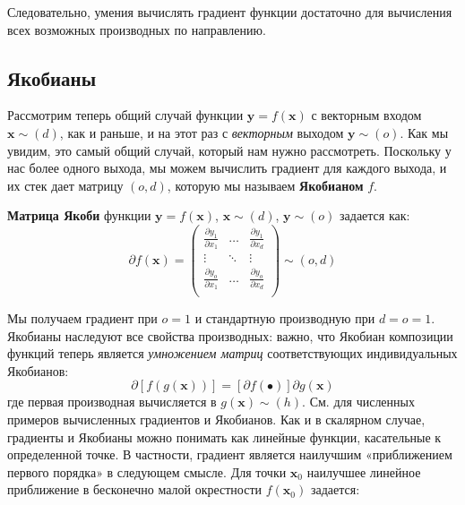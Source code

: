 Следовательно, умения вычислять градиент функции достаточно для вычисления всех возможных производных по направлению.

\subsection{Якобианы}

Рассмотрим теперь общий случай функции $\mathbf{y} = f(\mathbf{x})$ \addclock с векторным входом $\mathbf{x} \sim (d)$, как и раньше, и на этот раз с \textit{векторным} выходом $\mathbf{y} \sim(o)$. Как мы увидим, это самый общий случай, который нам нужно рассмотреть. Поскольку у нас более одного выхода, мы можем вычислить градиент для каждого выхода, и их стек дает матрицу $(o, d)$, которую мы называем \textbf{Якобианом} $f$.

\begin{definition}[Якобиан]
\textbf{Матрица Якоби} функции $\mathbf{y} = f(\mathbf{x})$, $\mathbf{x} \sim (d)$, $\mathbf{y} \sim (o)$ задается как:
%
\begin{equation}
\partial f(\mathbf{x}) = \begin{pmatrix}		\frac{\partial y_1}{\partial x_1} & \dots & \frac{\partial y_1}{\partial x_d} \\		\vdots & \ddots & \vdots \\		\frac{\partial y_o}{\partial x_1} & \dots & \frac{\partial y_o}{\partial x_d} \\	\end{pmatrix} \sim (o,d)
\end{equation}
\end{definition}

Мы получаем градиент при $o=1$ и стандартную производную при $d=o=1$. Якобианы наследуют все свойства производных: важно, что Якобиан композиции функций теперь является \textit{умножением матриц} соответствующих индивидуальных Якобианов:
%
\begin{equation}
\partial\left[f(g(\mathbf{x}))\right] = \left[\partial f(\bullet)\right]\partial g(\mathbf{x})
\label{eq:jacobian_chain_rule}
\end{equation}
%
где первая производная вычисляется в $g(\mathbf{x}) \sim (h)$. См. \cite[Глава 2]{petersen2008matrix} для численных примеров вычисленных градиентов и Якобианов. Как и в скалярном случае, градиенты и Якобианы можно понимать как линейные функции, касательные к определенной точке. В частности, градиент является наилучшим «приближением первого порядка» в следующем смысле. Для точки $\mathbf{x}_0$ наилучшее линейное приближение в бесконечно малой окрестности $f(\mathbf{x}_0)$ задается:

